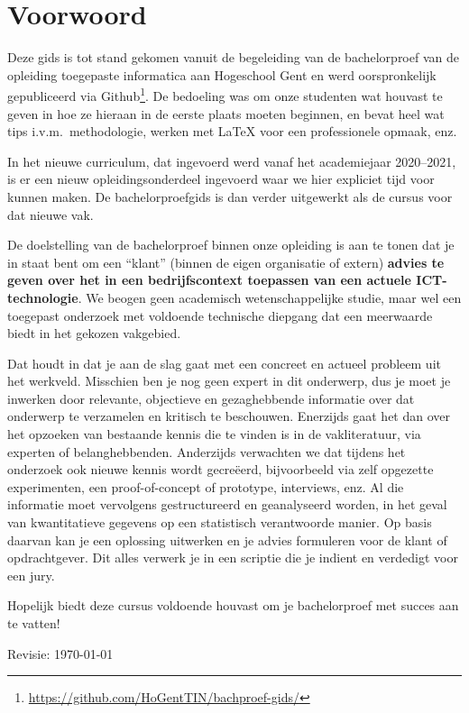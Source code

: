 \chapter*{Voorwoord}%
\label{ch:voorwoord}

Deze gids is tot stand gekomen vanuit de begeleiding van de bachelorproef van de opleiding toegepaste informatica aan Hogeschool Gent en werd oorspronkelijk gepubliceerd via Github\footnote{\url{https://github.com/HoGentTIN/bachproef-gids/}}. De bedoeling was om onze studenten wat houvast te geven in hoe ze hieraan in de eerste plaats moeten beginnen, en bevat heel wat tips i.v.m.\ methodologie, werken met {\LaTeX} voor een professionele opmaak, enz.

In het nieuwe curriculum, dat ingevoerd werd vanaf het academiejaar 2020--2021, is er een nieuw opleidingsonderdeel ingevoerd waar we hier expliciet tijd voor kunnen maken. De bachelorproefgids is dan verder uitgewerkt als de cursus voor dat nieuwe vak.

De doelstelling van de bachelorproef binnen onze opleiding is aan te tonen dat je in staat bent om een ``klant'' (binnen de eigen organisatie of extern) \textbf{advies te geven over het in een bedrijfscontext toepassen van een actuele ICT-technologie}. We beogen geen academisch wetenschappelijke studie, maar wel een toegepast onderzoek met voldoende technische diepgang dat een meerwaarde biedt in het gekozen vakgebied.

Dat houdt in dat je aan de slag gaat met een concreet en actueel probleem uit het werkveld. Misschien ben je nog geen expert in dit onderwerp, dus je moet je inwerken door relevante, objectieve en gezaghebbende informatie over dat onderwerp te verzamelen en kritisch te beschouwen. Enerzijds gaat het dan over het opzoeken van bestaande kennis die te vinden is in de vakliteratuur, via experten of belanghebbenden. Anderzijds verwachten we dat tijdens het onderzoek ook nieuwe kennis wordt gecreëerd, bijvoorbeeld via zelf opgezette experimenten, een proof-of-concept of prototype, interviews, enz. Al die informatie moet vervolgens gestructureerd en geanalyseerd worden, in het geval van kwantitatieve gegevens op een statistisch verantwoorde manier. Op basis daarvan kan je een oplossing uitwerken en je advies formuleren voor de klant of opdrachtgever. Dit alles verwerk je in een scriptie die je indient en verdedigt voor een jury.

Hopelijk biedt deze cursus voldoende houvast om je bachelorproef met succes aan te vatten!

\bigskip
Revisie: \today